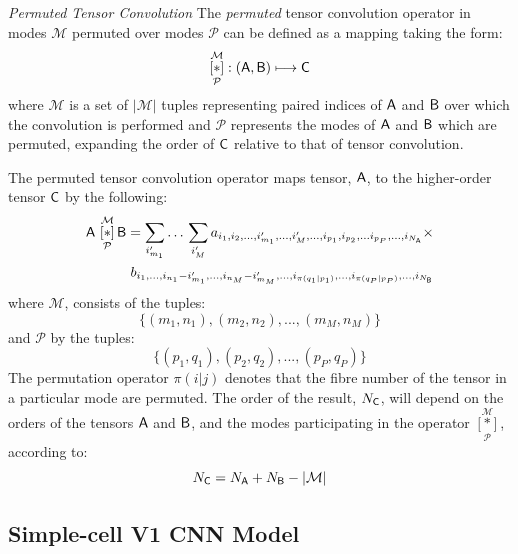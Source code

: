 \begin{definition}{\textit{Permuted Tensor Convolution}} \label{def:permconvop} The \textit{permuted} tensor convolution operator in modes $\mathcal{M}$ permuted over modes $\mathcal{P}$ can be defined as a mapping taking the form:
\begin{equation}
 \underset{\mathcal{P}}{\overset{\mathcal{M}}{[ \ast ]}}: \left (\mathsf{A},\mathsf{B}  \right ) \longmapsto \mathsf{C}
\end{equation}
 where $\mathcal{M}$ is a set of $|\mathcal{M}|$ tuples representing paired indices of $\mathsf{A}$ and $\mathsf{B}$ over which the convolution is performed and $\mathcal{P}$ represents the modes of $\mathsf{A}$ and $\mathsf{B}$ which are permuted, expanding the order of $\mathsf{C}$ relative to that of tensor convolution.

The permuted tensor convolution operator maps tensor, $\mathsf{A}$, to the higher-order tensor $\mathsf{C}$ by the following:
\begin{eqnarray}
\mathsf{A} \,\, \underset{\mathcal{P}}{\overset{\mathcal{M}}{[ \ast ]}}\, 
{\mathsf{B}} = \sum_{i'_{m_1}}\ldots\,\sum_{i_{M}'}  a_{i_1,i_2,...,i_{m_1}',...,i_{M}',...,i_{p_1},i_{p_2},...i_{p_P},...,i_{N_{\mathsf{A}}}} \times \nonumber \\
 b_{i_1,...,i_{n_1}-i_{m_1}',...,i_{n_M}-i_{m_M}',...,i_{\pi(q_1|p_1)},...,i_{\pi(q_P|p_P)},...,i_{N_{\mathsf{B}}}}
\label{eq:t2}
\end{eqnarray}
where $\mathcal{M}$, consists of the tuples:
\begin{equation}
\lbrace(m_1,n_1),(m_2,n_2),...,(m_{M},n_{M})\rbrace
\end{equation}
and $\mathcal{P}$ by the tuples:
\begin{equation}
\lbrace(p_1,q_1),(p_2,q_2),...,(p_{P},q_{P})\rbrace
\end{equation}
The permutation operator $\pi(i|j)$ denotes that the fibre number of the tensor in a particular mode are permuted.  The order of the result, $N_{\mathsf{C}}$, will depend on the orders of the tensors $\mathsf{A}$ and $\mathsf{B}$, and the modes participating in the operator $\underset{\mathcal{P}}{\overset{\mathcal{M}}{[ \ast ]}}$, according to:
\begin{equation}
N_{\mathsf{C}} = N_{\mathsf{A}} + N_{\mathsf{B}} - |\mathcal{M}|
\end{equation}

\end{definition}


\subsection{Simple-cell V1 CNN Model}


